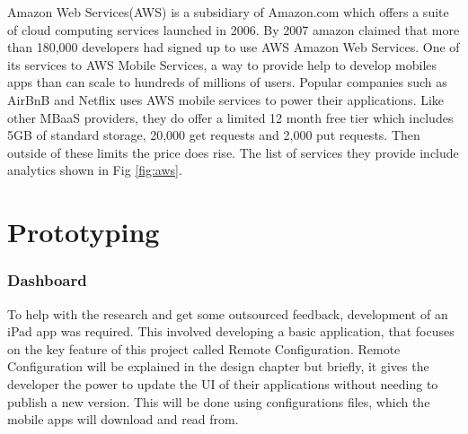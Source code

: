 Amazon Web Services(AWS) \cite{aws} is a subsidiary of Amazon.com which offers a suite of cloud computing services launched in 2006.  By 2007 amazon claimed that more than 180,000 developers had signed up to use AWS Amazon Web Services. One of its services to AWS Mobile Services, a way to provide help to develop mobiles apps than can scale to hundreds of millions of users. Popular companies such as AirBnB and Netflix uses AWS mobile services to power their applications. Like other MBaaS providers, they do offer a limited 12 month free tier which includes 5GB of standard storage, 20,000 get requests and 2,000 put requests. Then outside of these limits the price does rise. The list of services they provide include analytics shown in Fig \ref{fig:aws}.





\section{Prototyping}

\subsubsection{Dashboard}

To help with the research and get some outsourced feedback, development of an iPad app was required. This involved developing a basic application, that focuses on the key feature of this project called Remote Configuration. Remote Configuration will be explained in the design chapter but briefly, it gives the developer the power to update the UI of their applications without needing to publish a new version. This will be done using configurations files, which the mobile apps will download and read from.


